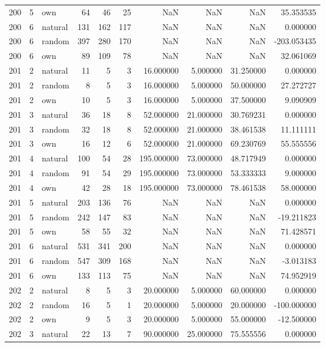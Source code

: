 \begin{table}[htbp]
\begin{tabular}{rrlrrrrrrr}
200 & 5 & own & 64 & 46 & 25 & NaN & NaN & NaN & 35.353535 \\
200 & 6 & natural & 131 & 162 & 117 & NaN & NaN & NaN & 0.000000 \\
200 & 6 & random & 397 & 280 & 170 & NaN & NaN & NaN & -203.053435 \\
200 & 6 & own & 89 & 109 & 78 & NaN & NaN & NaN & 32.061069 \\
201 & 2 & natural & 11 & 5 & 3 & 16.000000 & 5.000000 & 31.250000 & 0.000000 \\
201 & 2 & random & 8 & 5 & 3 & 16.000000 & 5.000000 & 50.000000 & 27.272727 \\
201 & 2 & own & 10 & 5 & 3 & 16.000000 & 5.000000 & 37.500000 & 9.090909 \\
201 & 3 & natural & 36 & 18 & 8 & 52.000000 & 21.000000 & 30.769231 & 0.000000 \\
201 & 3 & random & 32 & 18 & 8 & 52.000000 & 21.000000 & 38.461538 & 11.111111 \\
201 & 3 & own & 16 & 12 & 6 & 52.000000 & 21.000000 & 69.230769 & 55.555556 \\
201 & 4 & natural & 100 & 54 & 28 & 195.000000 & 73.000000 & 48.717949 & 0.000000 \\
201 & 4 & random & 91 & 54 & 29 & 195.000000 & 73.000000 & 53.333333 & 9.000000 \\
201 & 4 & own & 42 & 28 & 18 & 195.000000 & 73.000000 & 78.461538 & 58.000000 \\
201 & 5 & natural & 203 & 136 & 76 & NaN & NaN & NaN & 0.000000 \\
201 & 5 & random & 242 & 147 & 83 & NaN & NaN & NaN & -19.211823 \\
201 & 5 & own & 58 & 55 & 32 & NaN & NaN & NaN & 71.428571 \\
201 & 6 & natural & 531 & 341 & 200 & NaN & NaN & NaN & 0.000000 \\
201 & 6 & random & 547 & 309 & 168 & NaN & NaN & NaN & -3.013183 \\
201 & 6 & own & 133 & 113 & 75 & NaN & NaN & NaN & 74.952919 \\
202 & 2 & natural & 8 & 5 & 3 & 20.000000 & 5.000000 & 60.000000 & 0.000000 \\
202 & 2 & random & 16 & 5 & 1 & 20.000000 & 5.000000 & 20.000000 & -100.000000 \\
202 & 2 & own & 9 & 5 & 3 & 20.000000 & 5.000000 & 55.000000 & -12.500000 \\
202 & 3 & natural & 22 & 13 & 7 & 90.000000 & 25.000000 & 75.555556 & 0.000000 \\

\end{tabular}
\end{table}
